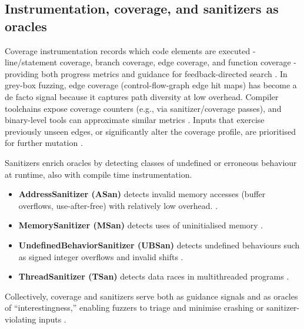 \subsection{Instrumentation, coverage, and sanitizers as oracles}

Coverage instrumentation records which code elements are executed - line/statement coverage, branch coverage, edge coverage, and function coverage - providing both progress metrics and guidance for feedback-directed search \cite{gnuproject_2024_gcov}. In grey-box fuzzing, edge coverage (control-flow-graph edge hit maps) has become a de facto signal because it captures path diversity at low overhead. Compiler toolchains expose coverage counters (e.g., via sanitizer/coverage passes), and binary-level tools can approximate similar metrics \cite{bhme_2016_coveragebased,luk_2005_pin,bellard_2005_qemu}. Inputs that exercise previously unseen edges, or significantly alter the coverage profile, are prioritised for further mutation \cite{bhme_2016_coveragebased,serebryany_2016_libfuzzer}.

Sanitizers enrich oracles by detecting classes of undefined or erroneous behaviour at runtime, also with compile time instrumentation.

\begin{itemize}
    \item \textbf{AddressSanitizer (ASan)} detects invalid memory accesses (buffer overflows, use-after-free) with relatively low overhead. \cite{serebryany_2012_addresssanitizer}.
    
    \item \textbf{MemorySanitizer (MSan)} detects uses of uninitialised memory \cite{llvmproject_2015_memorysanitizer}.
    
    \item \textbf{UndefinedBehaviorSanitizer (UBSan)} detects undefined behaviours such as signed integer overflows and invalid shifts \cite{llvmproject_2015_undefinedbehaviorsanitizer}.
    
    \item \textbf{ThreadSanitizer (TSan)} detects data races in multithreaded programs \cite{serebryany_2009_threadsanitizer}.
\end{itemize}

Collectively, coverage and sanitizers serve both as guidance signals and as oracles of ``interestingness,'' enabling fuzzers to triage and minimise crashing or sanitizer-violating inputs \cite{bhme_2016_coveragebased,serebryany_2016_libfuzzer}.






